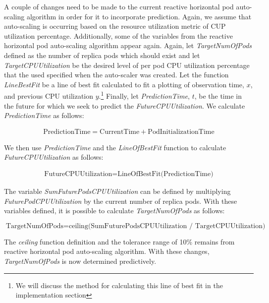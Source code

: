 A couple of changes need to be made to the current reactive horizontal pod
auto-scaling algorithm in order for it to incorporate prediction. Again, we
assume that auto-scaling is occurring based on the resource utilization metric of
CUP utilization percentage. Additionally, some of the variables from the
reactive horizontal pod auto-scaling algorithm appear again. Again, let
\textit{TargetNumOfPods} defined as the number of replica pods which should
exist and let \textit{TargetCPUUtilization} be the desired level of per pod CPU
utilization percentage that the used specified when the auto-scaler was created.
Let the function \textit{LineBestFit} be a line of best fit calculated
to fit a plotting of observation time, $x$, and previous CPU utilization
$y$.\footnote{We will discuss the method for calculating this line of best fit
in the implementation section} Finally, let
\textit{PredictionTime}, $t$, be the time in the future for
which we seek to predict the \textit{FutureCPUUtilization}. We calculate
\textit{PredictionTime} as follows:

\begin{align*}
  \mbox{PredictionTime} = \mbox{CurrentTime} + \mbox{{PodInitializationTime}}
\end{align*}

We then use \textit{PredictionTime} and the \textit{LineOfBestFit} function to
calculate \textit{FutureCPUUtilization} as follows:

\begin{align*}
  \mbox{FutureCPUUtilization} = \mbox{LineOfBestFit(PredictionTime)}
\end{align*}

The variable \textit{SumFuturePodsCPUUtilization} can be defined by multiplying
\textit{FuturePodCPUUtilization} by the current number of replica pods.
With these variables defined, it is possible to calculate
\textit{TargetNumOfPods} as follows:

\[ \mbox{TargetNumOfPods} = \mbox{ceiling(SumFuturePodsCPUUtilization /
TargetCPUUtilization)} \]

The \textit{ceiling} function definition and the tolerance range of 10\% remains from
reactive horizontal pod auto-scaling algorithm. With these changes,
\textit{TargetNumOfPods} is now determined predictively.
